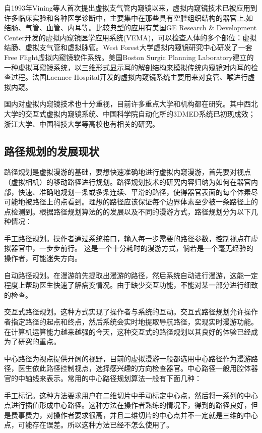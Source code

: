 自1993年Vining等人首次提出虚拟支气管内窥镜以来，虚拟内窥镜技术已被应用到许多临床实验和各种医学诊断中，主要集中在那些具有空腔组织结构的器官上,如结肠、气管、血管、内耳等。比较典型的应用有美国GE Research \& Development Center开发的虚拟内窥镜医学应用系统(VEMA)，可以检查人体的多个部位：虚拟结肠、虚拟支气管和虚拟脉管。West Forest大学虚拟内窥镜研究中心研发了一套Free Flight虚拟内窥镜软件系统。美国Boston Surgic Planning Laboratory建立的一种虚拟耳窥镜系统，以三维形式显示耳的解剖结构来模拟传统内窥镜对内耳的检查过程。法国Laennec Hospital开发的虚拟内窥镜系统主要用来对食管、喉进行虚拟内窥。

国内对虚拟内窥镜技术也十分重视，目前许多重点大学和机构都在研究。其中西北大学的交互式虚拟内窥镜系统、中国科学院自动化所的3DMED系统已初现成效；浙江大学、中国科技大学等高校也有相关的研究。

\subsection{路径规划的发展现状}
路径规划是虚拟漫游的基础，要想快速准确地进行虚拟内窥漫游，首先要对视点（虚拟相机）的移动路径进行规划。路径规划技术的研究内容归纳为如何在器官内部，快速、准确地规划一条或多条连续、平滑的路径，使得器官表面的每个体素尽可能地被路径上的点看到。理想的路径应该保证每个边界体素至少被一条路径上的点检测到。根据路径规划算法的的发展以及不同的漫游方式，路径规划分为以下几种情况：

手工路径规划。操作者通过系统接口，输入每一步需要的路径参数，控制视点在虚拟器官中，一步步前行。 这是一个十分耗时的漫游方式，倘若是一个毫无经验的操作者，可能迷失方向。

自动路径规划。在漫游前先提取出漫游的路径，然后系统自动进行漫游，这能一定程度上帮助医生快速了解病变情况。由于缺少交互功能，不能对某一部分进行细致的检查。

交互式路径规划。这种方式实现了操作者与系统的互动。交互式路径规划允许操作者指定路径的起点和终点，然后系统会实时地提取导航路径，实现实时漫游功能。在计算机运算能力越来越强的今天，这种交互式的路径规划以其良好的体验已经成为了研究的重点。

中心路径为视点提供开阔的视野，目前的虚拟漫游一般都选用中心路径作为漫游路径，医生依此路径控制视点，选择感兴趣的方向检查器官。中心路径一般用腔体器官的中轴线来表示。常用的中心路径规划算法一般有下面几种：

手工标记。这种方法要求用户在二维切片中手动标定中心点，然后将一系列的中心点进行插值形成中心路径。这种方法在操作者熟练的情况下，得到的路径良好，但是费事费力，对操作者要求很高，并且二维切片的中心点并不一定就是三维的中心点，可能存在误差。所以这种方法已经不怎么使用了。

